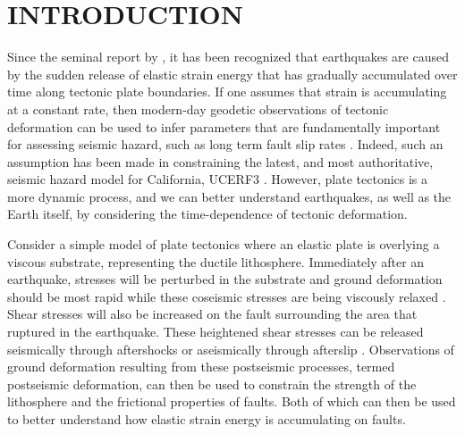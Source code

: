\chapter{INTRODUCTION}
Since the seminal report by \citet{Reid1910}, it has been recognized that earthquakes are caused by the sudden release of elastic strain energy that has gradually accumulated over time along tectonic plate boundaries. If one assumes that strain is accumulating at a constant rate, then modern-day geodetic observations of tectonic deformation can be used to infer parameters that are fundamentally important for assessing seismic hazard, such as long term fault slip rates \citep[e.g.,][]{Savage1973,Meade2005}. Indeed, such an assumption has been made in constraining the latest, and most authoritative, seismic hazard model for California, UCERF3 \citep{Field2014}. However, plate tectonics is a more dynamic process, and we can better understand earthquakes, as well as the Earth itself, by considering the time-dependence of tectonic deformation. 

Consider a simple model of plate tectonics where an elastic plate is overlying a viscous substrate, representing the ductile lithosphere. Immediately after an earthquake, stresses will be perturbed in the substrate and ground deformation should be most rapid while these coseismic stresses are being viscously relaxed \citep{Nur1974,Savage1978}. Shear stresses will also be increased on the fault surrounding the area that ruptured in the earthquake. These heightened shear stresses can be released seismically through aftershocks or aseismically through afterslip \citep{Marone1991}. Observations of ground deformation resulting from these postseismic processes, termed postseismic deformation, can then be used to constrain the strength of the lithosphere and the frictional properties of faults. Both of which can then be used to better understand how elastic strain energy is accumulating on faults. 


